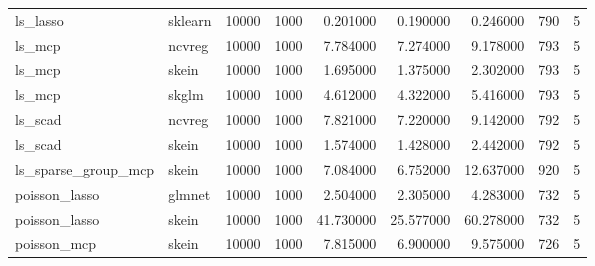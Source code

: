 \begin{table}[t]
\begin{tabular}{llrrrrrrr}
ls_lasso & sklearn & 10000 & 1000 & 0.201000 & 0.190000 & 0.246000 & 790 & 5 \\
ls_mcp & ncvreg & 10000 & 1000 & 7.784000 & 7.274000 & 9.178000 & 793 & 5 \\
ls_mcp & skein & 10000 & 1000 & 1.695000 & 1.375000 & 2.302000 & 793 & 5 \\
ls_mcp & skglm & 10000 & 1000 & 4.612000 & 4.322000 & 5.416000 & 793 & 5 \\
ls_scad & ncvreg & 10000 & 1000 & 7.821000 & 7.220000 & 9.142000 & 792 & 5 \\
ls_scad & skein & 10000 & 1000 & 1.574000 & 1.428000 & 2.442000 & 792 & 5 \\
ls_sparse_group_mcp & skein & 10000 & 1000 & 7.084000 & 6.752000 & 12.637000 & 920 & 5 \\
poisson_lasso & glmnet & 10000 & 1000 & 2.504000 & 2.305000 & 4.283000 & 732 & 5 \\
poisson_lasso & skein & 10000 & 1000 & 41.730000 & 25.577000 & 60.278000 & 732 & 5 \\
poisson_mcp & skein & 10000 & 1000 & 7.815000 & 6.900000 & 9.575000 & 726 & 5 \\
\bottomrule
\end{tabular}
\end{table}
